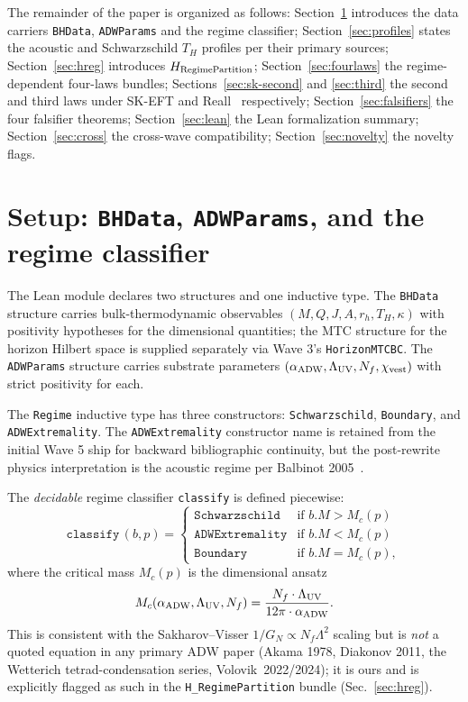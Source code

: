 \documentclass[prd,aps,twocolumn,floatfix,nofootinbib,superscriptaddress]{revtex4-2}
\newcommand{\Mc}{M_{c}}
\newcommand{\Thawk}{T_{H}}
\newcommand{\aADW}{\alpha_{\rm ADW}}
\newcommand{\Ladw}{\Lambda_{\rm UV}}
\newcommand{\Nf}{N_{f}}
\newcommand{\xivest}{\chi_{\rm vest}}
\begin{document}
The remainder of the paper is organized as follows:
Section~\ref{sec:setup} introduces the data carriers
\texttt{BHData}, \texttt{ADWParams} and the regime classifier;
Section~\ref{sec:profiles} states the acoustic and Schwarzschild
$\Thawk$ profiles per their primary sources; Section~\ref{sec:hreg}
introduces $H_{\rm RegimePartition}$;
Section~\ref{sec:fourlaws} the regime-dependent four-laws bundles;
Sections~\ref{sec:sk-second} and \ref{sec:third} the second and third
laws under SK-EFT and Reall~\cite{Reall2024ThirdLawBPS} respectively;
Section~\ref{sec:falsifiers} the four falsifier theorems;
Section~\ref{sec:lean} the Lean formalization summary;
Section~\ref{sec:cross} the cross-wave compatibility;
Section~\ref{sec:novelty} the novelty flags.

\section{Setup: \texttt{BHData}, \texttt{ADWParams}, and the regime classifier}
\label{sec:setup}

The Lean module declares two structures and one inductive type. The
\texttt{BHData} structure carries bulk-thermodynamic observables
$(M, Q, J, A, r_h, \Thawk, \kappa)$ with positivity hypotheses for the
dimensional quantities; the MTC structure for the horizon Hilbert
space is supplied separately via Wave 3's \texttt{HorizonMTCBC}.
The \texttt{ADWParams} structure carries substrate parameters
$(\aADW, \Ladw, \Nf, \xivest)$ with strict positivity for each.

The \texttt{Regime} inductive type has three constructors:
\texttt{Schwarzschild}, \texttt{Boundary}, and \texttt{ADWExtremality}.
The \texttt{ADWExtremality} constructor name is retained from the
initial Wave 5 ship for backward bibliographic continuity, but the
post-rewrite physics interpretation is the acoustic regime per
Balbinot 2005~\cite{Balbinot2005PRD}.

The \emph{decidable} regime classifier \texttt{classify} is defined
piecewise:
\begin{equation}
\texttt{classify}\,(b, p) = \begin{cases}
  \texttt{Schwarzschild}     & \text{if } b.M > \Mc(p) \\
  \texttt{ADWExtremality}    & \text{if } b.M < \Mc(p) \\
  \texttt{Boundary}          & \text{if } b.M = \Mc(p),
\end{cases}
\label{eq:classify}
\end{equation}
where the critical mass $\Mc(p)$ is the dimensional ansatz
\begin{equation}
\Mc(\aADW, \Ladw, \Nf) =
\frac{\Nf \cdot \Ladw}{12\pi \cdot \aADW}.
\label{eq:Mc-default}
\end{equation}
This is consistent with the Sakharov--Visser
$1/G_N \propto \Nf \Lambda^2$ scaling but is \emph{not} a quoted
equation in any primary ADW paper (Akama 1978, Diakonov 2011, the
Wetterich tetrad-condensation series, Volovik~2022/2024); it is
ours and is explicitly flagged as such in the \texttt{H\_RegimePartition}
bundle (Sec.~\ref{sec:hreg}).
\end{document}
